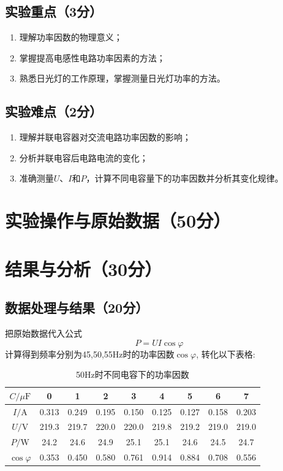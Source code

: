 \documentclass[10pt,a4paper]{ctexart} %
\begin{document}
  \subsection{实验重点（3分）}
  \begin{enumerate}
    \item 理解功率因数的物理意义；
    \item 掌握提高电感性电路功率因素的方法；
    \item 熟悉日光灯的工作原理，掌握测量日光灯功率的方法。
  \end{enumerate}

  \subsection{实验难点（2分）}
  \begin{enumerate}
    \item 理解并联电容器对交流电路功率因数的影响；
    \item 分析并联电容后电路电流的变化；
    \item 准确测量$U$、$I$和$P$，计算不同电容量下的功率因数并分析其变化规律。
  \end{enumerate}

\section{实验操作与原始数据（50分）}

\section{结果与分析（30分）}

  \subsection{数据处理与结果（20分）}  
  把原始数据代入公式
  \[
  P=UI\cos\varphi
  \]
  计算得到频率分别为45,50,55Hz时的功率因数$\cos\varphi$, 转化以下表格:
  \begin{table}[H]
    \centering
    \caption{50Hz时不同电容下的功率因数}
    \begin{tabular}{ccccccccc}
      \toprule
      $C/\mu\mathrm{F}$ & 0 & 1 & 2 & 3 & 4 & 5 & 6 & 7 \\
      \midrule
      $I/\mathrm{A}$ & 0.313 & 0.249 & 0.195 & 0.150 & 0.125 & 0.127 & 0.158 & 0.203 \\
      $U/\mathrm{V}$ & 219.3 & 219.7 & 220.0 & 220.0 & 219.8 & 219.2 & 219.0 & 219.0 \\
      $P/\mathrm{W}$ & 24.2 & 24.6 & 24.9 & 25.1 & 25.1 & 24.6 & 24.5 & 24.7 \\
      $\cos\varphi$ & 0.353 & 0.450 & 0.580 & 0.761 & 0.914 & 0.884 & 0.708 & 0.556 \\
      \bottomrule
    \end{tabular}
  \end{table}
\end{document}
